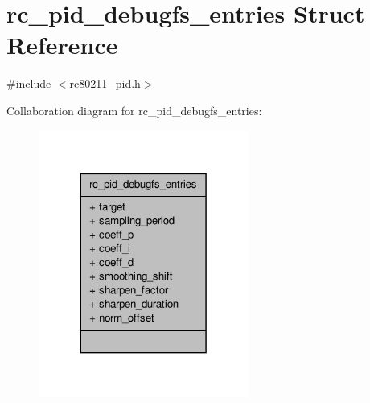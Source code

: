 \hypertarget{structrc__pid__debugfs__entries}{\section{rc\-\_\-pid\-\_\-debugfs\-\_\-entries Struct Reference}
\label{structrc__pid__debugfs__entries}
}


{\ttfamily \#include $<$rc80211\-\_\-pid.\-h$>$}



Collaboration diagram for rc\-\_\-pid\-\_\-debugfs\-\_\-entries\-:
\nopagebreak
\begin{figure}[H]
\begin{center}
\leavevmode
\includegraphics[width=196pt]{structrc__pid__debugfs__entries__coll__graph}
\end{center}
\end{figure}
